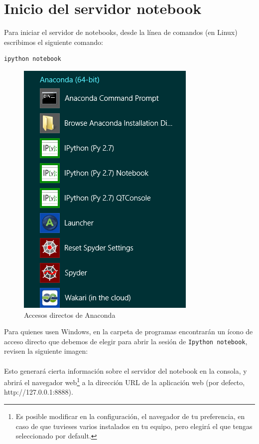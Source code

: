 \documentclass[12pt]{article}
\begin{document}
\section{Inicio del servidor notebook}
Para iniciar el servidor de notebooks, desde la línea de comandos (en Linux) escribimos el siguiente comando: 
\begin{verbatim}
ipython notebook 
\end{verbatim}
\newpage
\begin{figure}
\centering
\includegraphics[scale=0.6]{Imagenes/ipython_notebook_01.png}
\caption{Accesos directos de Anaconda}
\end{figure}
Para quienes usen Windows, en la carpeta de programas encontrarán un ícono de acceso directo que debemos de elegir para abrir la sesión de \texttt{Ipython notebook}, revisen la siguiente imagen:
\\
\\
Esto generará cierta información sobre el servidor del notebook en la consola, y abrirá el navegador web\footnote{Es posible modificar en la configuración, el navegador de tu preferencia, en caso de que tuvieses varios instalados en tu equipo, pero elegirá el que tengas seleccionado por default.} a la dirección URL de la aplicación web (por defecto, http://127.0.0.1:8888). 
\end{document}
